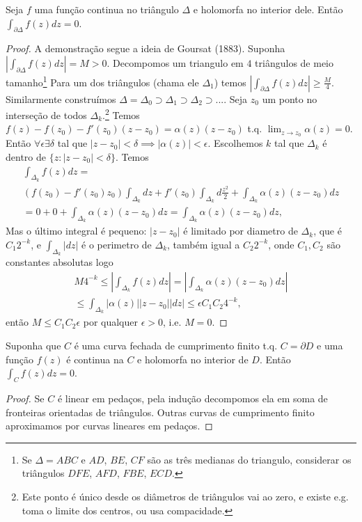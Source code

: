 \begin{lema}
Seja $f$ uma função continua no triângulo $\Delta$ e holomorfa no interior dele.
Então $\int_{\partial\Delta} f(z) dz = 0$.
\end{lema}
\begin{proof}
A demonstração segue a ideia de Goursat (1883).
Suponha $|\int_{\partial\Delta} f(z) dz| = M > 0$.
Decompomos um triangulo em $4$ triângulos de meio tamanho\footnote{
Se $\Delta = ABC$ e $AD$, $BE$, $CF$ são as três medianas do triangulo,
considerar os triângulos $DFE$, $AFD$, $FBE$, $ECD$.}
Para um dos triângulos (chama ele $\Delta_1$) temos
$|\int_{\partial\Delta} f(z) dz| \geq \frac{M}{4}$.
Similarmente construímos $\Delta = \Delta_0 \supset \Delta_1 \supset \Delta_2 \supset ...$.
Seja $z_0$ um ponto no interseção de todos $\Delta_k$.\footnote{
Este ponto é único desde os diâmetros de triângulos vai ao zero,
e existe e.g. toma o limite dos centros, ou usa compacidade.}
Temos $f(z) - f(z_0) - f'(z_0) (z-z_0) = \alpha(z) (z-z_0)$ t.q.
$\lim_{z\to z_0} \alpha(z) = 0$. Então $\forall \epsilon \exists \delta$ tal que
$|z-z_0|<\delta \implies |\alpha(z)|<\epsilon$. Escolhemos $k$ tal que
$\Delta_k$ é dentro de $\{z: |z-z_0|<\delta\}$.
Temos
\begin{multline}
\int_{\Delta_k} f(z) dz = \\
(f(z_0)-f'(z_0)z_0) \int_{\Delta_k} dz + f'(z_0) \int_{\Delta_k} d\frac{z^2}{2}
+ \int_{\Delta_k} \alpha(z) (z-z_0) dz \\
= 0 + 0 + \int_{\Delta_k} \alpha(z) (z-z_0) dz = \int_{\Delta_k} \alpha(z) (z-z_0) dz,
\end{multline}
Mas o último integral é pequeno: $|z-z_0|$ é limitado por diametro de $\Delta_k$,
que é $C_1 2^{-k}$, e $\int_{\Delta_k} |dz|$ é o perimetro de $\Delta_k$, também igual a $C_2 2^{-k}$,
onde $C_1,C_2$ são constantes absolutas
logo
\begin{multline*}
M 4^{-k} \leq |\int_{\Delta_k} f(z) dz| = |\int_{\Delta_k} \alpha(z) (z-z_0) dz| \\
\leq \int_{\Delta_k} |\alpha(z)| |z-z_0| |dz| \leq \epsilon C_1 C_2 4^{-k},
\end{multline*}
então $M \leq C_1 C_2 \epsilon$ por qualquer $\epsilon>0$, i.e. $M=0$.
\end{proof}

\begin{teorema}
\label{t:cauchy}
Suponha que $C$ é uma curva fechada de cumprimento finito t.q. $C = \partial D$
e uma função $f(z)$ é continua na $C$ e holomorfa no interior de $D$. Então
$\int_C f(z) dz = 0$.
\end{teorema}
\begin{proof}
Se $C$ é linear em pedaços, pela indução decompomos ela em soma de fronteiras orientadas de triângulos.
Outras curvas de cumprimento finito aproximamos por curvas lineares em pedaços.
\end{proof}

